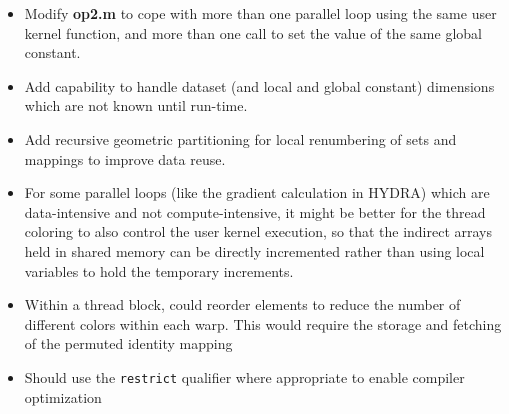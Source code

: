 \documentclass[12pt]{article}
\begin{document}
\begin{itemize}
\item
Modify {\bf op2.m} to cope with more than one parallel loop using 
the same user kernel function, and more than one call to set the 
value of the same global constant.

\item
Add capability to handle dataset (and local and global constant) dimensions 
which are not known until run-time.

\item
Add recursive geometric partitioning for local renumbering of sets and 
mappings to improve data reuse.

\item
For some parallel loops (like the gradient calculation in HYDRA)
which are data-intensive and not compute-intensive, it might be better 
for the thread coloring to also control the user kernel execution, so 
that the indirect arrays held in shared memory can be directly incremented 
rather than using local variables to hold the temporary increments.

\item
Within a thread block, could reorder elements to reduce the number of 
different colors within each warp.  This would require the storage and 
fetching of the permuted identity mapping 

\item
Should use the {\tt restrict} qualifier where appropriate to enable 
compiler optimization

\end{itemize}
\end{document}
